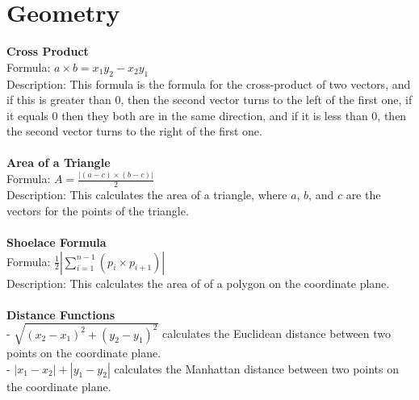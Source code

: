 \documentclass[12pt]{report}
\begin{document}
\section{Geometry}
\textbf{Cross Product}\\
Formula: \(a\times{b}=x_1y_2-x_2y_1\)\\
Description: This formula is the formula for the cross-product of two vectors, and if this is greater than \(0\), then the second vector turns to the left of the first one, if it equals \(0\) then they both are in the same direction, and if it is less than \(0\), then the second vector turns to the right of the first one.\\\\
\textbf{Area of a Triangle}\\
Formula: \(A=\frac{|(a-c)\times(b-c)|}{2}\)\\
Description: This calculates the area of a triangle, where \(a\), \(b\), and \(c\) are the vectors for the points of the triangle.\\\\
\textbf{Shoelace Formula}\\
Formula: \(\frac{1}{2}|\sum_{i=1}^{n-1}(p_i\times{p_{i+1}})|\)\\
Description: This calculates the area of of a polygon on the coordinate plane.\\\\
\textbf{Distance Functions}\\
- \(\sqrt{(x_2-x_1)^2+(y_2-y_1)^2}\) calculates the Euclidean distance between two points on the coordinate plane.\\
- \(|x_1-x_2|+|y_1-y_2|\) calculates the Manhattan distance between two points on the coordinate plane.\\
\end{document}
